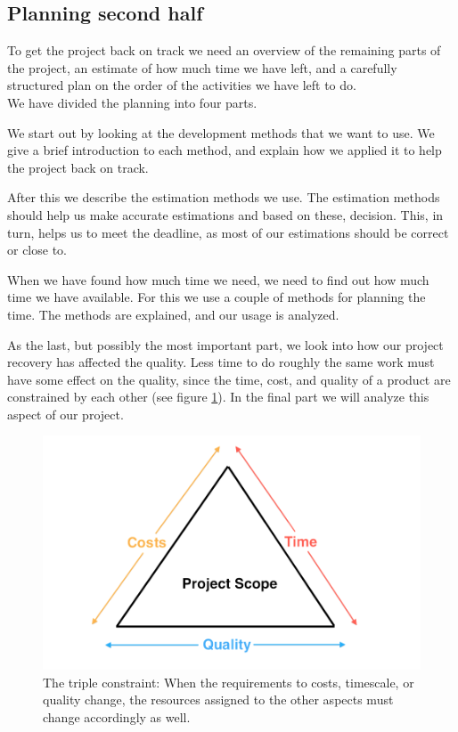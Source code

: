 \subsection{Planning second half}
To get the project back on track we need an overview of the remaining parts of the project, an estimate of how much time we have left, and a carefully structured plan on the order of the activities we have left to do.\\
We have divided the planning into four parts.

We start out by looking at the development methods that we want to use. We give a brief introduction to each method, and explain how we applied it to help the project back on track.

After this we describe the estimation methods we use. The estimation methods should help us make accurate estimations and based on these, decision. This, in turn, helps us to meet the deadline, as most of our estimations should be correct or close to.

When we have found how much time we need, we need to find out how much time we have available. For this we use a couple of methods for planning the time. The methods are explained, and our usage is analyzed.

As the last, but possibly the most important part, we look into how our project recovery has affected the quality. Less time to do roughly the same work must have some effect on the quality, since the time, cost, and quality of a product are constrained by each other (see figure \ref{fig:timeCostsQuality})\cite[p. 191]{PM}. In the final part we will analyze this aspect of our project.

\begin{figure}[t]
  \includegraphics[width=\textwidth]{illustrations/timeCostsQuality}
  \caption{The triple constraint: When the requirements to costs, timescale, or quality change, the resources assigned to the other aspects must change accordingly as well.}
  \label{fig:timeCostsQuality}
\end{figure}
